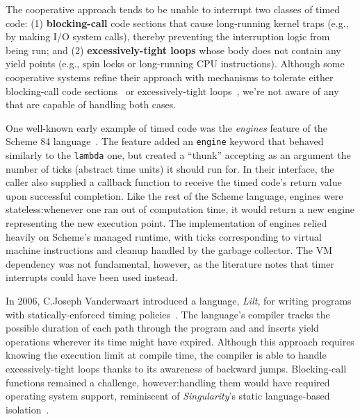 
The cooperative approach tends to be unable to interrupt two classes of timed code:\@
(1) \textbf{blocking-call} code sections that cause
long-running kernel traps (e.g., by making I/O system calls),
thereby preventing the interruption logic from being run; and (2)
\textbf{excessively-tight loops} whose body does not contain any yield points (e.g.,
spin locks or long-running CPU instructions).
Although some cooperative systems refine their approach with mechanisms
to tolerate either blocking-call code sections~\cite{www-golang} or excessively-tight
loops~\cite{vanderwaart:cmucs2006}, we're not aware of any that are capable of
handling both
cases.

One well-known early example of timed code was the \textit{engines} feature of
the Scheme 84 language~\cite{haynes:iucs1984}.  The feature added an \texttt{engine}
keyword that behaved similarly to the \texttt{lambda} one, but created a ``thunk''
accepting as an argument the number of ticks (abstract time units) it should run for.
In their interface, the caller also supplied a callback function to receive the
timed code's return value upon successful completion.  Like the rest of the
Scheme language, engines were stateless:\@ whenever one ran out of computation time,
it would return a new engine representing the new execution point.  The
implementation of engines relied heavily on Scheme's managed runtime, with ticks
corresponding to virtual machine instructions and cleanup handled by the garbage
collector.  The VM dependency was not fundamental, however, as the literature notes
that timer interrupts could have been used instead.


In 2006, C.\@ Joseph Vanderwaart introduced a language, \textit{Lilt}, for writing
programs with statically-enforced timing policies~\cite{vanderwaart:cmucs2006}.  The
language's compiler tracks the possible duration of each path through the program and
and inserts yield operations wherever its time might have expired.  Although this
approach requires knowing the execution limit at compile time, the compiler is able
to handle excessively-tight loops thanks to its awareness of backward jumps.
Blocking-call functions remained a challenge, however:\@ handling them would have
required
operating system support, reminiscent of \textit{Singularity}'s static language-based
isolation~\cite{hunt:msr2005}.


